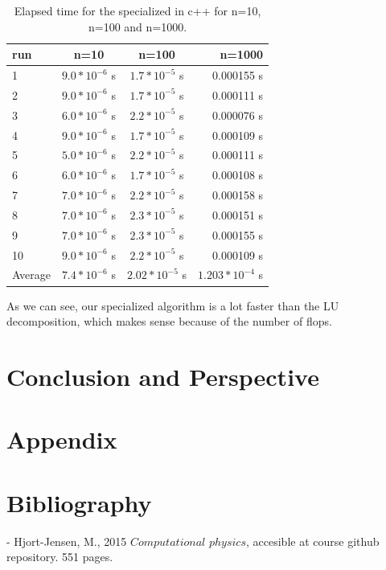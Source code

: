 \documentclass[%
oneside,                 %
final,                   %
10pt]{article}
\begin{document}
\begin{table}[H]
    \centering
    \begin{tabular}{|l|c|c|r|}
    \hline
     run & n=10 & n=100 & n=1000\\
     \hline
      1  & $9.0*10^{-6}$ s & $1.7*10^{-5}$ s & 0.000155 s\\
      2  & $9.0*10^{-6}$ s & $1.7*10^{-5}$ s & 0.000111 s\\
      3  & $6.0*10^{-6}$ s & $2.2*10^{-5}$ s & $0.000076$ s\\
      4  & $9.0*10^{-6}$ s& $1.7*10^{-5}$ s & 0.000109 s\\
      5  & $5.0*10^{-6}$ s& $2.2*10^{-5}$ s & 0.000111 s\\
      6  & $6.0*10^{-6}$ s& $1.7*10^{-5}$ s  & 0.000108 s\\
      7  & $7.0*10^{-6}$ s & $2.2*10^{-5}$ s & 0.000158 s\\
      8  & $7.0*10^{-6}$ s & $2.3*10^{-5}$ s & 0.000151 s\\
      9  & $7.0*10^{-6}$ s & $2.3*10^{-5}$ s  & 0.000155 s\\
      10 & $9.0*10^{-6}$ s & $2.2*10^{-5}$ s & 0.000109 s\\
      \hline
      Average & $7.4*10^{-6}$ s & $2.02*10^{-5}$ s & $1.203*10^{-4}$ s\\
      \hline
    \end{tabular}
    \caption{Elapsed time for the specialized in c++ for n=10, n=100 and n=1000.}
    \label{tab:my_label}
\end{table}

As we can see, our specialized algorithm is a lot faster than the LU decomposition, which makes sense because of the number of flops.


\section{Conclusion and Perspective}

\section{Appendix}

\section{Bibliography}

- Hjort-Jensen, M., 2015 $Computational$ $physics$, accesible at course github repository. 551 pages.
\end{document}
